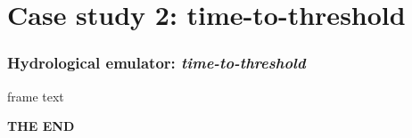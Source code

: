 \documentclass[xcolor=dvipsnames, USenglish]{beamer}  %
\begin{document}






\section{Case study 2: time-to-threshold}

  \begin{frame}
    \frametitle{Hydrological emulator: \emph{time-to-threshold}}
    frame text
  \end{frame}



  {
  \begin{frame}[plain]
    \centering
    \Large{\textbf{THE END}}\\
  \end{frame}
  }
\end{document}
